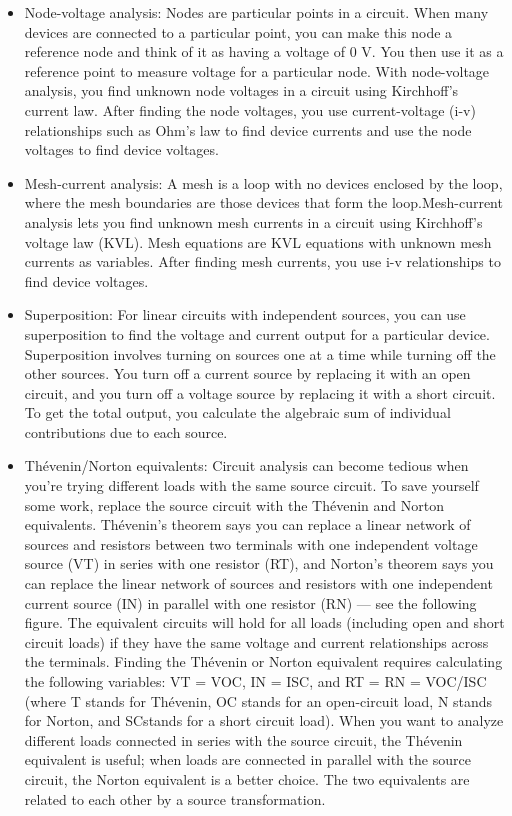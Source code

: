 \documentclass[10pt,landscape,twocolumn]{article}
\begin{document}
\begin{itemize}
	\item Node-voltage analysis: Nodes are particular points in a circuit. When many devices are connected to a particular point, you can make this node a reference node and think of it as having a voltage of 0 V. You then use it as a reference point to measure voltage for a particular node.
With node-voltage analysis, you find unknown node voltages in a circuit using Kirchhoff’s current law. After finding the node voltages, you use current-voltage (i-v) relationships such as Ohm’s law to find device currents and use the node voltages to find device voltages.
	\item Mesh-current analysis: A mesh is a loop with no devices enclosed by the loop, where the mesh boundaries are those devices that form the loop.Mesh-current analysis lets you find unknown mesh currents in a circuit using Kirchhoff’s voltage law (KVL). Mesh equations are KVL equations with unknown mesh currents as variables. After finding mesh currents, you use i-v relationships to find device voltages.
	\item Superposition: For linear circuits with independent sources, you can use superposition to find the voltage and current output for a particular device. Superposition involves turning on sources one at a time while turning off the other sources. You turn off a current source by replacing it with an open circuit, and you turn off a voltage source by replacing it with a short circuit. To get the total output, you calculate the algebraic sum of individual contributions due to each source.
	\item Thévenin/Norton equivalents: Circuit analysis can become tedious when you’re trying different loads with the same source circuit. To save yourself some work, replace the source circuit with the Thévenin and Norton equivalents. Thévenin’s theorem says you can replace a linear network of sources and resistors between two terminals with one independent voltage source (VT) in series with one resistor (RT), and Norton’s theorem says you can replace the linear network of sources and resistors with one independent current source (IN) in parallel with one resistor (RN) — see the following figure. The equivalent circuits will hold for all loads (including open and short circuit loads) if they have the same voltage and current relationships across the terminals.
Finding the Thévenin or Norton equivalent requires calculating the following variables: VT = VOC, IN = ISC, and RT = RN = VOC/ISC (where T stands for Thévenin, OC stands for an open-circuit load, N stands for Norton, and SCstands for a short circuit load). When you want to analyze different loads connected in series with the source circuit, the Thévenin equivalent is useful; when loads are connected in parallel with the source circuit, the Norton equivalent is a better choice. The two equivalents are related to each other by a source transformation.

\end{itemize}
\end{document}

